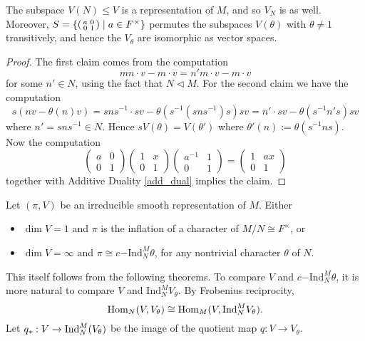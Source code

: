 \begin{lemma}\label{coinvariants}
	The subspace $V(N) \leq V$ is a representation of $M$, and so $V_N$ is as well. Moreover, $S = \{\begin{psmallmatrix}
        a&0\\0&1
    \end{psmallmatrix} \mid a \in F^\times\}$ permutes the subspaces $V(\theta)$ with $\theta \not= 1$ transitively, and hence the $V_\theta$ are isomorphic as vector spaces.
\end{lemma}
\begin{proof}
	The first claim comes from the computation 
	$$mn\cdot v - m\cdot v = n'm\cdot v - m\cdot v$$ for some $n' \in N$, using the fact that $N \lhd M$. For the second claim we have the computation
	\[s(nv - \theta(n)v) = sns^{-1}\cdot sv - \theta (s^{-1}(sns^{-1})s)sv = n'\cdot sv - \theta(s^{-1}n's) sv\]
	where $n' = sns^{-1}\in N$. Hence $sV(\theta) = V(\theta')$ where $\theta'(n) := \theta(s^{-1}ns)$. Now the computation
	\[\begin{pmatrix}
		a & 0 \\ 0 & 1
	\end{pmatrix}\begin{pmatrix}
		1 & x \\ 0 & 1
	\end{pmatrix}\begin{pmatrix}
		a^{-1} & 1 \\ 0 & 1
	\end{pmatrix} = \begin{pmatrix}
		1 & ax \\ 0 & 1
	\end{pmatrix}\]
	together with Additive Duality \ref{add_dual} implies the claim.
\end{proof}



\begin{thm}\label{inf dim}
    Let $(\pi,V)$ be an irreducible smooth representation of $M$. Either 
    \begin{itemize}
        \item $\dim V=1$ and $\pi$ is the inflation of a character of $M/N \cong F^\times$, or
        \item $\dim V = \infty$ and $\pi \cong c\mathrm{-Ind}_N^M \theta$, for any nontrivial character $\theta$ of $N$.
    \end{itemize}
\end{thm}

This itself follows from the following theorems. To compare $V$ and $c\mathrm{-Ind}_N^M \theta$, it is more natural to compare $V$ and $\mathrm{Ind}_N^M V_\theta$. By Frobenius reciprocity,
$$\mathrm{Hom}_N(V,V_\theta) \cong \mathrm{Hom}_M(V,\mathrm{Ind}_N^M V_\theta).$$
Let $q_*: V \to \mathrm{Ind}_N^M(V_\theta)$ be the image of the quotient map $q: V \to V_\theta$.

